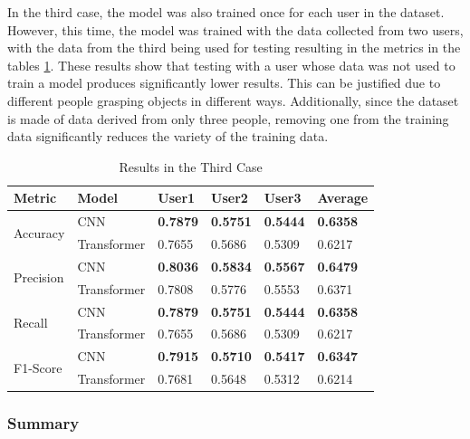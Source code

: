 In the third case, the model was also trained once for each user in the dataset. However, this time, the model was trained with the data collected from two users, with the data from the third being used for testing resulting in the metrics in the tables \ref{table:results_third_case}. These results show that testing with a user whose data was not used to train a model produces significantly lower results. This can be justified due to different people grasping objects in different ways. Additionally, since the dataset is made of data derived from only three people, removing one from the training data significantly reduces the variety of the training data.

\begin{table}[H]
    \centering
    \caption{Results in the Third Case}
    \label{table:results_third_case}
    \begin{tabular}{|l|l|l|l|l|l|}
        \hline
        Metric & Model & User1 & User2 & User3 & Average \\
        \hline \hline
        \multirow{2}{*}{Accuracy} & CNN & \textbf{0.7879} & \textbf{0.5751} & \textbf{0.5444} & \textbf{0.6358} \\
        \cline{2-6}
        & Transformer & 0.7655 & 0.5686 & 0.5309 & 0.6217 \\
        \hline \hline
        \multirow{2}{*}{Precision} & CNN & \textbf{0.8036} & \textbf{0.5834} & \textbf{0.5567} & \textbf{0.6479} \\
        \cline{2-6}
        & Transformer & 0.7808 & 0.5776 & 0.5553 & 0.6371 \\
        \hline \hline
        \multirow{2}{*}{Recall} & CNN & \textbf{0.7879} & \textbf{0.5751} & \textbf{0.5444} & \textbf{0.6358} \\
        \cline{2-6}
        & Transformer & 0.7655 & 0.5686 & 0.5309 & 0.6217 \\
        \hline \hline
        \multirow{2}{*}{F1-Score} & CNN & \textbf{0.7915} & \textbf{0.5710} & \textbf{0.5417} & \textbf{0.6347} \\
        \cline{2-6}
        & Transformer & 0.7681 & 0.5648 & 0.5312 & 0.6214 \\
        \hline
    \end{tabular}
\end{table}

\subsubsection{Summary}

